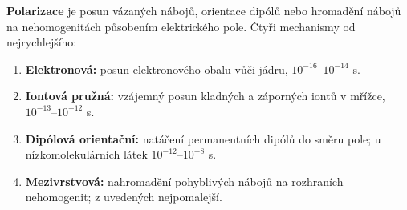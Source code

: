 \textbf{Polarizace} je posun vázaných nábojů, orientace dipólů nebo hromadění nábojů na nehomogenitách působením elektrického pole. Čtyři mechanismy od nejrychlejšího:
\begin{enumerate}
\item \textbf{Elektronová:} posun elektronového obalu vůči jádru, $10^{-16}$--$10^{-14}$ s.
\item \textbf{Iontová pružná:} vzájemný posun kladných a záporných iontů v mřížce, $10^{-13}$--$10^{-12}$ s.
\item \textbf{Dipólová orientační:} natáčení permanentních dipólů do směru pole; u nízkomolekulárních látek $10^{-12}$--$10^{-8}$ s.
\item \textbf{Mezivrstvová:} nahromadění pohyblivých nábojů na rozhraních nehomogenit; z uvedených nejpomalejší.
\end{enumerate}
